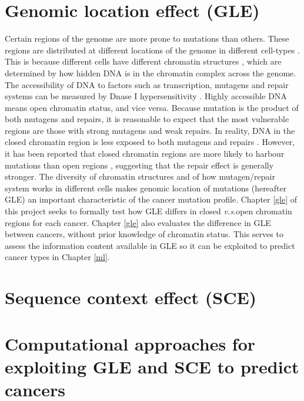 \section{Genomic location effect (GLE)}
\label{intro:gle}
Certain regions of the genome are more prone to mutations than others. These regions are distributed at different locations of the genome in different cell-types \citep{Polak2015}. This is because different cells have different chromatin structures \citep{Abascal2020ExpandedGenomes}, which are determined by how hidden DNA is in the chromatin complex across the genome. The accessibility of DNA to factors such as transcription, mutagens and repair systems can be measured by Dnase I hypersensitivity \citep[DHS;][]{Liu2019AApplications}. Highly accessible DNA means open chromatin status, and vice versa. Because mutation is the product of both \glspl{mutagen} and repairs, it is reasonable to expect that the most vulnerable regions are those with strong mutagens and weak repairs. In reality, DNA in the closed chromatin region is less exposed to both mutagens and repairs \citep[Figure \ref{fig:chromatin_demo};][]{Teng1997ExcisionSequences, Morse2002PhotoreactivationCerevisiae}. However, it has been reported that closed chromatin regions are more likely to harbour mutations than open regions \citep{Polak2015,Prendergast2007ChromatinGenome}, suggesting that the repair effect is generally stronger. The diversity of chromatin structures and of how mutagen/repair system works in different cells makes genomic location of mutations (hereafter GLE) an important characteristic of the cancer mutation profile. Chapter \ref{gle} of this project seeks to formally test how GLE differs in closed \textit{v.s.}open chromatin regions for each cancer. Chapter \ref{gle} also evaluates the difference in GLE between cancers, without prior knowledge of chromatin status. This serves to assess the information content available in GLE so it can be exploited to predict cancer types in Chapter \ref{ml}.



\section{Sequence context effect (SCE)}
\label{intro:sce}
\section{Computational approaches for exploiting GLE and SCE to predict cancers}
\label{intro:ml}